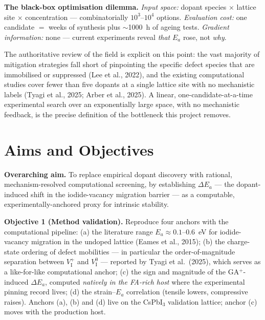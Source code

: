 \documentclass[11pt,a4paper]{article}
\begin{document}
\begin{keybox}
\textbf{The black-box optimisation dilemma.} \emph{Input space:} dopant species
$\times$ lattice site $\times$ concentration --- combinatorially $10^3$--$10^4$
options. \emph{Evaluation cost:} one candidate $=$ weeks of synthesis plus
$\sim$1000~h of ageing tests. \emph{Gradient information:} none --- current
experiments reveal \emph{that} $E_a$ rose, not \emph{why}.
\end{keybox}

The authoritative review of the field is explicit on this point: the vast majority of
mitigation strategies fall short of pinpointing the specific defect species that are
immobilised or suppressed (Lee et al., 2022), and the existing computational studies
cover fewer than five dopants at a single lattice site with no mechanistic labels
(Tyagi et al., 2025; Arber et al., 2025). A linear, one-candidate-at-a-time
experimental search over an exponentially large space, with no mechanistic feedback, is
the precise definition of the bottleneck this project removes.

\section{Aims and Objectives}

\textbf{Overarching aim.} To replace empirical dopant discovery with rational,
mechanism-resolved computational screening, by establishing $\Delta E_a$ --- the
dopant-induced shift in the iodide-vacancy migration barrier --- as a computable,
experimentally-anchored proxy for intrinsic stability.

\textbf{Objective 1 (Method validation).} Reproduce four anchors with the
computational pipeline: (a) the literature range $E_a\approx0.1$--$0.6$~eV for
iodide-vacancy migration in the undoped lattice (Eames et al., 2015); (b) the
charge-state ordering of defect mobilities --- in particular the order-of-magnitude
separation between $V_{\mathrm{I}}^{+}$ and $V_{\mathrm{I}}^{0}$ --- reported by Tyagi
et al.\ (2025), which serves as a like-for-like computational anchor; (c) the sign and
magnitude of the GA$^+$-induced $\Delta E_a$, computed \emph{natively in the FA-rich
host} where the experimental pinning record lives; (d) the strain--$E_a$ correlation
(tensile lowers, compressive raises). Anchors (a), (b) and (d) live on the CsPbI$_3$
validation lattice; anchor (c) moves with the production host.
\end{document}
